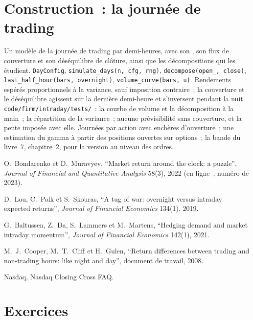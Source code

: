 \section{Construction~: la journée de trading}\label{bld:s1:intraday-patterns:intraday}

\begin{build}
 Un modèle de la journée de trading par demi-heures, avec son , son flux de couverture et son déséquilibre de clôture, ainsi que les décompositions qui les étudient.
 \texttt{DayConfig}, \texttt{simulate\_days(n, cfg, rng)}, \texttt{decompose(open\_, close)}, \texttt{last\_half\_hour(bars, overnight)},
\texttt{volume\_curve(bars, u)}.
 Rendements espérés proportionnels à la variance, sauf imposition contraire~; la couverture et le déséquilibre agissent sur la dernière demi-heure et s'inversent
pendant la nuit.
 \texttt{code/firm/intraday/tests/}~: la courbe de volume et la décomposition à la main~; la répartition de la variance~; aucune prévisibilité sans
couverture, et la pente imposée avec elle.
 Journées par action avec enchères d'ouverture~; une estimation du gamma à partir des positions ouvertes sur options~; la bande du livre~7, chapitre~2, pour la version au niveau des ordres.
\end{build}

\begin{omsources}
\item O.~Bondarenko et D.~Muravyev, ``Market return around the clock: a puzzle'', \emph{Journal of Financial and Quantitative Analysis} 58(3), 2022 (en ligne~; numéro de 2023).
\item D.~Lou, C.~Polk et S.~Skouras, ``A tug of war: overnight versus intraday expected returns'', \emph{Journal of Financial Economics} 134(1), 2019.
\item G.~Baltussen, Z.~Da, S.~Lammers et M.~Martens, ``Hedging demand and market intraday momentum'', \emph{Journal of Financial Economics} 142(1), 2021.
\item M.~J.~Cooper, M.~T.~Cliff et H.~Gulen, ``Return differences between trading and non-trading hours: like night and day'', document de travail, 2008.
\item Nasdaq, Nasdaq Closing Cross FAQ.
\end{omsources}

\section{Exercices}

